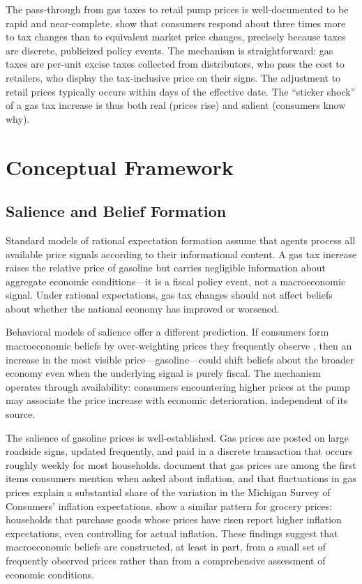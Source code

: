 \documentclass[12pt]{article}
\begin{document}
The pass-through from gas taxes to retail pump prices is well-documented to be rapid and near-complete. \citet{li2014gasoline} show that consumers respond about three times more to tax changes than to equivalent market price changes, precisely because taxes are discrete, publicized policy events. The mechanism is straightforward: gas taxes are per-unit excise taxes collected from distributors, who pass the cost to retailers, who display the tax-inclusive price on their signs. The adjustment to retail prices typically occurs within days of the effective date. The ``sticker shock'' of a gas tax increase is thus both real (prices rise) and salient (consumers know why).

\section{Conceptual Framework}

\subsection{Salience and Belief Formation}

Standard models of rational expectation formation assume that agents process all available price signals according to their informational content. A gas tax increase raises the relative price of gasoline but carries negligible information about aggregate economic conditions---it is a fiscal policy event, not a macroeconomic signal. Under rational expectations, gas tax changes should not affect beliefs about whether the national economy has improved or worsened.

Behavioral models of salience offer a different prediction. If consumers form macroeconomic beliefs by over-weighting prices they frequently observe \citep{bordalo2013salience, dacunto2021exposure}, then an increase in the most visible price---gasoline---could shift beliefs about the broader economy even when the underlying signal is purely fiscal. The mechanism operates through availability: consumers encountering higher prices at the pump may associate the price increase with economic deterioration, independent of its source.

The salience of gasoline prices is well-established. Gas prices are posted on large roadside signs, updated frequently, and paid in a discrete transaction that occurs roughly weekly for most households. \citet{binder2022stuck} document that gas prices are among the first items consumers mention when asked about inflation, and that fluctuations in gas prices explain a substantial share of the variation in the Michigan Survey of Consumers' inflation expectations. \citet{dacunto2021exposure} show a similar pattern for grocery prices: households that purchase goods whose prices have risen report higher inflation expectations, even controlling for actual inflation. These findings suggest that macroeconomic beliefs are constructed, at least in part, from a small set of frequently observed prices rather than from a comprehensive assessment of economic conditions.
\end{document}
